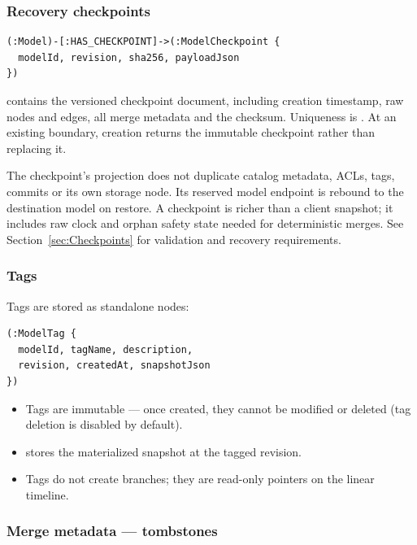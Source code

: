 \subsubsection{Recovery checkpoints}

\begin{lstlisting}[caption={Checkpoint node and ownership}]
(:Model)-[:HAS_CHECKPOINT]->(:ModelCheckpoint {
  modelId, revision, sha256, payloadJson
})
\end{lstlisting}

 contains the versioned checkpoint document, including
creation timestamp, raw nodes and edges, all merge metadata and the checksum.
Uniqueness is . At an existing boundary, creation
returns the immutable checkpoint rather than replacing it.

The checkpoint's projection does not duplicate catalog metadata, ACLs, tags,
commits or its own storage node. Its reserved model endpoint is rebound to the
destination model on restore. A checkpoint is richer than a client snapshot;
it includes raw clock and orphan safety state needed for deterministic merges.
See Section~\ref{sec:Checkpoints} for validation and recovery requirements.

\subsubsection{Tags}

Tags are stored as standalone nodes:

\begin{lstlisting}[caption={Tag node}]
(:ModelTag {
  modelId, tagName, description,
  revision, createdAt, snapshotJson
})
\end{lstlisting}

\begin{itemize}
\item Tags are immutable --- once created, they cannot be modified or deleted
  (tag deletion is disabled by default).
\item {} stores the materialized snapshot at the tagged
  revision.
\item Tags do not create branches; they are read-only pointers on the linear
  timeline.
\end{itemize}

\subsubsection{Merge metadata --- tombstones}

